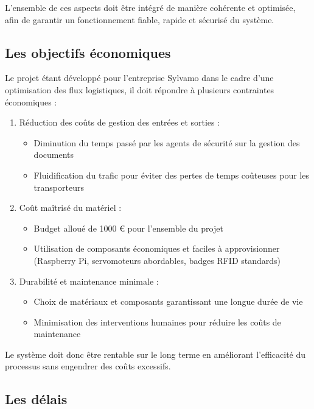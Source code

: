 \documentclass[main.tex]{subfiles}
\begin{document}
L’ensemble de ces aspects doit être intégré de manière cohérente et optimisée, afin de garantir un fonctionnement fiable, rapide et sécurisé du système.


\subsection{Les objectifs économiques}

\quad Le projet étant développé pour l’entreprise Sylvamo dans le cadre d’une optimisation des flux logistiques, il doit répondre à plusieurs contraintes économiques :

\begin{enumerate}

	\item Réduction des coûts de gestion des entrées et sorties :
	\begin{itemize}
		\item Diminution du temps passé par les agents de sécurité sur la gestion des documents
		\item Fluidification du trafic pour éviter des pertes de temps coûteuses pour les transporteurs
	\end{itemize}
	\item Coût maîtrisé du matériel :
	\begin{itemize}
		\item Budget alloué de 1000 € pour l’ensemble du projet
		\item Utilisation de composants économiques et faciles à approvisionner (Raspberry Pi, servomoteurs abordables, badges RFID standards)
	\end{itemize}
	\item Durabilité et maintenance minimale :
	\begin{itemize}
		\item Choix de matériaux et composants garantissant une longue durée de vie
		\item Minimisation des interventions humaines pour réduire les coûts de maintenance
	\end{itemize}

\end{enumerate}

Le système doit donc être rentable sur le long terme en améliorant l’efficacité du processus sans engendrer des coûts excessifs.

\newpage

\subsection{Les délais}
\end{document}
